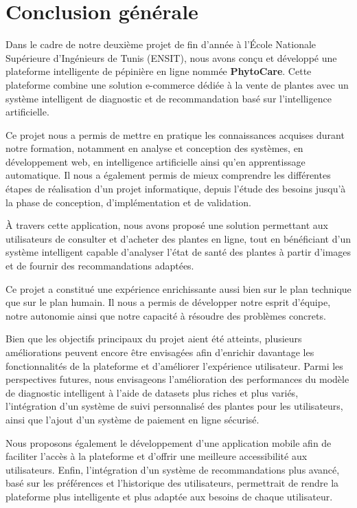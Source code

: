 \chapter*{Conclusion générale}

Dans le cadre de notre deuxième projet de fin d’année à l’École Nationale Supérieure d’Ingénieurs de Tunis (ENSIT), nous avons conçu et développé une plateforme intelligente de pépinière en ligne nommée \textbf{PhytoCare}. Cette plateforme combine une solution e-commerce dédiée à la vente de plantes avec un système intelligent de diagnostic et de recommandation basé sur l’intelligence artificielle.

Ce projet nous a permis de mettre en pratique les connaissances acquises durant notre formation, notamment en analyse et conception des systèmes, en développement web, en intelligence artificielle ainsi qu’en apprentissage automatique. Il nous a également permis de mieux comprendre les différentes étapes de réalisation d’un projet informatique, depuis l’étude des besoins jusqu’à la phase de conception, d’implémentation et de validation.

À travers cette application, nous avons proposé une solution permettant aux utilisateurs de consulter et d’acheter des plantes en ligne, tout en bénéficiant d’un système intelligent capable d’analyser l’état de santé des plantes à partir d’images et de fournir des recommandations adaptées.

Ce projet a constitué une expérience enrichissante aussi bien sur le plan technique que sur le plan humain. Il nous a permis de développer notre esprit d’équipe, notre autonomie ainsi que notre capacité à résoudre des problèmes concrets.

Bien que les objectifs principaux du projet aient été atteints, plusieurs améliorations peuvent encore être envisagées afin d’enrichir davantage les fonctionnalités de la plateforme et d’améliorer l’expérience utilisateur. Parmi les perspectives futures, nous envisageons l’amélioration des performances du modèle de diagnostic intelligent à l’aide de datasets plus riches et plus variés, l’intégration d’un système de suivi personnalisé des plantes pour les utilisateurs, ainsi que l’ajout d’un système de paiement en ligne sécurisé.

Nous proposons également le développement d’une application mobile afin de faciliter l’accès à la plateforme et d’offrir une meilleure accessibilité aux utilisateurs. Enfin, l’intégration d’un système de recommandations plus avancé, basé sur les préférences et l’historique des utilisateurs, permettrait de rendre la plateforme plus intelligente et plus adaptée aux besoins de chaque utilisateur.

